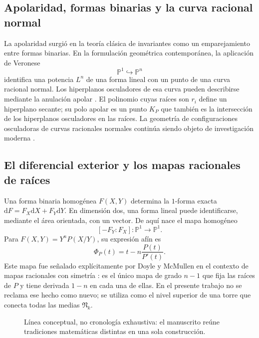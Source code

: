 \documentclass[11pt,oneside]{scrartcl}
\theoremstyle{plainblue}
\theoremstyle{definitionblue}
\theoremstyle{remarkgray}
\newcommand{\PP}{\mathbb{P}}
\newcommand{\dd}{\mathrm{d}}
\newcommand{\cN}{\mathfrak{N}}
\begin{document}
\subsection{Apolaridad, formas binarias y la curva racional normal}

La apolaridad surgió en la teoría clásica de invariantes como un emparejamiento entre
formas binarias. En la formulación geométrica contemporánea, la aplicación de
Veronese
\[
\PP^1\hookrightarrow\PP^n
\]
identifica una potencia \(L^n\) de una forma lineal con un punto de una curva racional
normal. Los hiperplanos osculadores de esa curva pueden describirse mediante la
anulación apolar \cite{Dolgachev,IarrobinoKanev,Olver}. El polinomio cuyas raíces son \(r_i\) define un hiperplano secante;
su polo apolar es un punto \(K_P\) que también es la intersección de los hiperplanos
osculadores en las raíces. La geometría de configuraciones osculadoras de curvas
racionales normales continúa siendo objeto de investigación moderna
\cite{CaminataCarliniSchaffler}.

\subsection{El diferencial exterior y los mapas racionales de raíces}

Una forma binaria homogénea \(F(X,Y)\) determina la $1$-forma exacta
\(\dd F=F_X\dd X+F_Y\dd Y\). En dimensión dos, una forma lineal puede identificarse,
mediante el área orientada, con un vector. De aquí nace el mapa homogéneo
\[
[-F_Y:F_X]:\PP^1\longrightarrow\PP^1.
\]
Para \(F(X,Y)=Y^nP(X/Y)\), su expresión afín es
\[
\Phi_P(t)=t-n\frac{P(t)}{P'(t)}.
\]
Este mapa fue señalado explícitamente por Doyle y McMullen en el contexto de mapas
racionales con simetría \cite{DoyleMcMullen}: es el único mapa de grado \(n-1\) que fija las raíces de
\(P\) y tiene derivada \(1-n\) en cada una de ellas. En el presente trabajo no se
reclama ese hecho como nuevo; se utiliza como el nivel superior de una torre que
conecta todas las medias \(\cN_k\).

\begin{figure}[ht]
\centering
{}
\caption{Línea conceptual, no cronología exhaustiva: el manuscrito reúne tradiciones matemáticas distintas en una sola construcción.}
\label{fig:timeline}
\end{figure}
\end{document}
